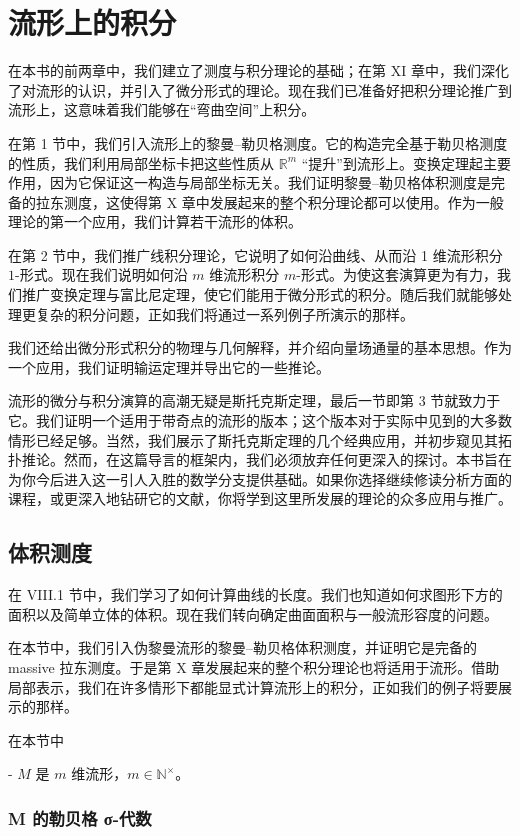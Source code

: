 \chapter{流形上的积分}
在本书的前两章中，我们建立了测度与积分理论的基础；在第 XI 章中，我们深化了对流形的认识，并引入了微分形式的理论。现在我们已准备好把积分理论推广到流形上，这意味着我们能够在“弯曲空间”上积分。

在第 1 节中，我们引入流形上的黎曼–勒贝格测度。它的构造完全基于勒贝格测度的性质，我们利用局部坐标卡把这些性质从 $ \mathbb{R}^m $ “提升”到流形上。变换定理起主要作用，因为它保证这一构造与局部坐标无关。我们证明黎曼–勒贝格体积测度是完备的拉东测度，这使得第 X 章中发展起来的整个积分理论都可以使用。作为一般理论的第一个应用，我们计算若干流形的体积。

在第 2 节中，我们推广线积分理论，它说明了如何沿曲线、从而沿 1 维流形积分 $ 1 $-形式。现在我们说明如何沿 $ m $ 维流形积分 $ m $-形式。为使这套演算更为有力，我们推广变换定理与富比尼定理，使它们能用于微分形式的积分。随后我们就能够处理更复杂的积分问题，正如我们将通过一系列例子所演示的那样。

我们还给出微分形式积分的物理与几何解释，并介绍向量场通量的基本思想。作为一个应用，我们证明输运定理并导出它的一些推论。

流形的微分与积分演算的高潮无疑是斯托克斯定理，最后一节即第 3 节就致力于它。我们证明一个适用于带奇点的流形的版本；这个版本对于实际中见到的大多数情形已经足够。当然，我们展示了斯托克斯定理的几个经典应用，并初步窥见其拓扑推论。然而，在这篇导言的框架内，我们必须放弃任何更深入的探讨。本书旨在为你今后进入这一引人入胜的数学分支提供基础。如果你选择继续修读分析方面的课程，或更深入地钻研它的文献，你将学到这里所发展的理论的众多应用与推广。

\section{体积测度}

在 VIII.1 节中，我们学习了如何计算曲线的长度。我们也知道如何求图形下方的面积以及简单立体的体积。现在我们转向确定曲面面积与一般流形容度的问题。

在本节中，我们引入伪黎曼流形的黎曼–勒贝格体积测度，并证明它是完备的 massive 拉东测度。于是第 X 章发展起来的整个积分理论也将适用于流形。借助局部表示，我们在许多情形下都能显式计算流形上的积分，正如我们的例子将要展示的那样。

在本节中

- $ M $ 是 $ m $ 维流形，$ m \in \mathbb{N}^{\times} $。

\subsection*{M 的勒贝格 σ-代数}

